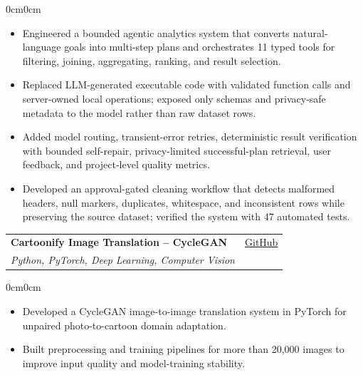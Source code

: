 \documentclass[10pt, letterpaper]{article}
\newenvironment{highlights}{
    \begin{itemize}[
        topsep=0.04cm,
        parsep=0.02cm,
        partopsep=0pt,
        itemsep=0.03cm,
        leftmargin=12pt
    ]
}{
    \end{itemize}
}
\newenvironment{onecolentry}{
    \begin{adjustwidth}{0cm}{0cm}
}{
    \end{adjustwidth}
}
\begin{document}
\begin{onecolentry}
\begin{highlights}
    \item Engineered a bounded agentic analytics system that converts
    natural-language goals into multi-step plans and orchestrates 11 typed
    tools for filtering, joining, aggregating, ranking, and result selection.
    \item Replaced LLM-generated executable code with validated function calls
    and server-owned local operations; exposed only schemas and privacy-safe
    metadata to the model rather than raw dataset rows.
    \item Added model routing, transient-error retries, deterministic result
    verification with bounded self-repair, privacy-limited successful-plan
    retrieval, user feedback, and project-level quality metrics.
    \item Developed an approval-gated cleaning workflow that detects malformed
    headers, null markers, duplicates, whitespace, and inconsistent rows while
    preserving the source dataset; verified the system with 47 automated tests.
\end{highlights}
\end{onecolentry}

\vspace{0.10cm}

\begin{tabularx}{\textwidth}{Xr}
    \textbf{Cartoonify Image Translation -- CycleGAN}
        & \href{https://github.com/JamieWei213213/Cartoonify}{GitHub}\\
    \textit{Python, PyTorch, Deep Learning, Computer Vision}
        & \\
\end{tabularx}

\begin{onecolentry}
\begin{highlights}
    \item Developed a CycleGAN image-to-image translation system in PyTorch for
    unpaired photo-to-cartoon domain adaptation.
    \item Built preprocessing and training pipelines for more than 20,000
    images to improve input quality and model-training stability.
\end{highlights}
\end{onecolentry}

\end{document}
